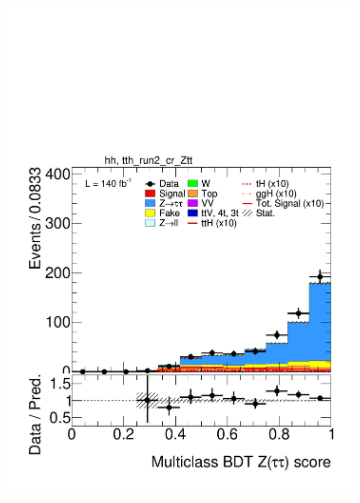 \begin{figure}[htbp]
  \begin{subfigure}[b]{0.49\textwidth}
    \centering
    \includegraphics[width=\textwidth]{images/plots_modelling_run2_run3_variables/run_2_tth/plot_tth_th_multiclass_Z_hh_tth_run2_cr_Ztt_15_16_17_18.pdf}
    \caption{}


\end{subfigure}
\end{figure}
